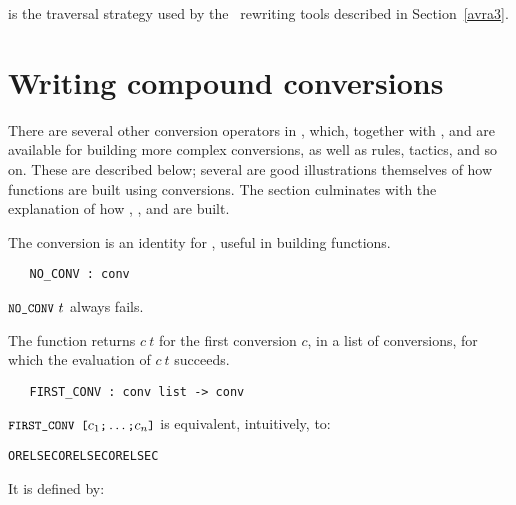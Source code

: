 is the traversal
strategy used by the \HOL\ rewriting tools described in Section~\ref{avra3}.

\section{Writing compound conversions}
\label{avra2}

There are several other conversion operators in \HOL, which,
together with ,  and  are available
for building more complex conversions, as well as rules, tactics, and so on.
These are described below; several are good illustrations themselves
of how functions are built using conversions. The section culminates
with the explanation of how , , and
 are built.

The conversion  is an identity for
, useful
in building functions.

\begin{boxed}
\begin{verbatim}
   NO_CONV : conv
\end{verbatim}\end{boxed}

\noindent $\ml{NO\_CONV}\ t$ always fails.

The function 
returns $c\ t$ for the first conversion $c$, in a list of conversions,
for which the evaluation of $c\ t$ succeeds.

\begin{boxed}
\begin{verbatim}
   FIRST_CONV : conv list -> conv
\end{verbatim}\end{boxed}

\noindent $\ml{FIRST\_CONV [}c_1\ml{;}\ldots\ml{;}c_n\ml{]}$ is equivalent,
intuitively, to:

\begin{hol}
\begin{alltt}
    ORELSEC  ORELSEC \m{\ldots} ORELSEC 
\end{alltt}\end{hol}

\noindent It is defined by:


